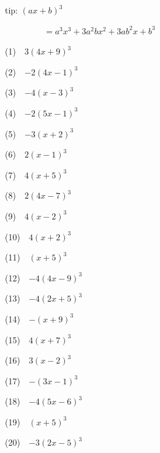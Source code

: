 \documentclass[a4j,twocolumn,10pt,fleqn]{jarticle}
\begin{document}
tip: $\left(a x + b\right)^{3}$

~~~~~~~~~$=a^{3} x^{3} + 3 a^{2} b x^{2} + 3 a b^{2} x + b^{3}$


(1)~~$3\left(4 x + 9\right)^{3}$

(2)~~$-2\left(4 x - 1\right)^{3}$

(3)~~$-4\left(x - 3\right)^{3}$

(4)~~$-2\left(5 x - 1\right)^{3}$

(5)~~$-3\left(x + 2\right)^{3}$

(6)~~$2\left(x - 1\right)^{3}$

(7)~~$4\left(x + 5\right)^{3}$

(8)~~$2\left(4 x - 7\right)^{3}$

(9)~~$4\left(x - 2\right)^{3}$

(10)~~$4\left(x + 2\right)^{3}$

(11)~~$\left(x + 5\right)^{3}$

(12)~~$-4\left(4 x - 9\right)^{3}$

(13)~~$-4\left(2 x + 5\right)^{3}$

(14)~~$-\left(x + 9\right)^{3}$

(15)~~$4\left(x + 7\right)^{3}$

(16)~~$3\left(x - 2\right)^{3}$

(17)~~$-\left(3 x - 1\right)^{3}$

(18)~~$-4\left(5 x - 6\right)^{3}$

(19)~~$\left(x + 5\right)^{3}$

(20)~~$-3\left(2 x - 5\right)^{3}$
\end{document}
